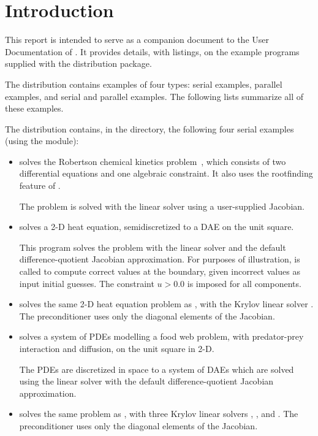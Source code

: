 \section{Introduction}\label{s:ex_intro}

This report is intended to serve as a companion document to the User
Documentation of {\ida} \cite{ida2.4.0_ug}.  It provides details, with
listings, on the example programs supplied with the {\ida} distribution
package.

The {\ida} distribution contains examples of four types: serial
{\C} examples, parallel {\C} examples, and serial and parallel {\F}
examples.  The following lists summarize all of these examples.

The {\ida} distribution contains, in the 
directory, the following four serial examples (using the {\nvecs} module):
\begin{itemize}

\item {}
  solves the Robertson chemical kinetics problem~\cite{Rob:66}, which consists
  of two differential equations and one algebraic constraint.  It also uses
  the rootfinding feature of {\ida}.

  The problem is solved with the {\idadense} linear solver using
  a user-supplied Jacobian.

\item {}
  solves a 2-D heat equation, semidiscretized to a DAE on the unit square.

  This program solves the problem with the {\idaband} linear solver and
  the default difference-quotient Jacobian approximation. For purposes of
  illustration,  is called to compute correct values at the
  boundary, given incorrect values as input initial guesses. The constraint
  $u > 0.0$ is imposed for all components.

\item {}
  solves the same 2-D heat equation problem as , with the Krylov
  linear solver {\idaspgmr}. The preconditioner uses only the diagonal elements
  of the Jacobian.

\item {}
  solves a system of PDEs modelling a food web problem, with predator-prey
  interaction and diffusion, on the unit square in 2-D.

  The PDEs are discretized in space to a system of DAEs which are solved
  using the {\idaband} linear solver with the default difference-quotient 
  Jacobian approximation.

\item {}
  solves the same problem as , with three Krylov linear solvers
  {\idaspgmr}, {\idaspbcg}, and {\idasptfqmr}.  The preconditioner uses only
  the diagonal elements of the Jacobian.

\end{itemize}

